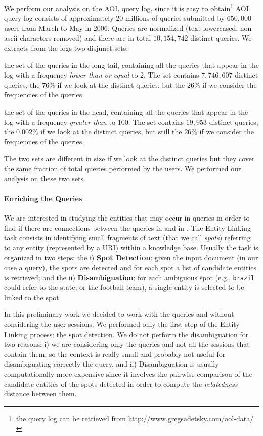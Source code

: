 We perform our analysis on the AOL query log, since it is easy to obtain\footnote{the query log can be retrieved from \url{http://www.gregsadetsky.com/aol-data/}}
AOL query log consists of approximately 20 millions of queries submitted by $650,000$ users from March to May in 2006. Queries are normalized (text lowercased, non ascii characters removed) and 
there are in total $10,154,742$ distinct queries. We extracts from the logs two disjunct sets: 
\begin{description}
	\item{\tail{}} the set of the queries in the long tail, containing all the queries that appear in the log with a frequency \emph{lower than or equal} to $2$. The set contains 
	$7,746,607$ distinct queries, the $76\%$ if we look at the distinct queries, but the $26\%$ if we consider the frequencies of the queries.
	\item{\head{}} the set of the queries in the head, containing all the queries that appear in the log with a frequency \emph{greater than} to $100$. The set contains 
	$19,953$ distinct queries, the $0.002\%$ if we look at the distinct queries, but still the $26\%$ if we consider the frequencies of the queries.
\end{description}
The two sets are different in size if we look at the distinct queries but they cover the same fraction of total queries performed by the users. We performed our 
analysis on these two sets.

\paragraph{Enriching the Queries}
We are interested in studying the entities that may occur in queries in order to find if there are connections between the queries in \head{} and in \tail{}.
The Entity Linking task consists in identifying  small fragments of text (that we call \emph{spots}) referring to any entity (represented by a URI) 
within a knowledge base. Usually the task is organized in two steps: the i) \textbf{Spot Detection}: given the input document (in our case a query), 
the spots are detected and for each spot a list of candidate entities is retrieved; and the ii) \textbf{Disambiguation}:
for each ambiguous spot (e.g., \texttt{brazil} could refer to the state, or the football team), a single  entity is 
selected  to be linked to the spot.

In this preliminary work we decided to work with the queries and without considering the user sessions. We performed only the first step of the Entity Linking 
process: the spot detection. We do not perform the disambiguation for two reasons: i) we are considering only the queries and not all the sessions that contain 
them, so the context is really small and probably not useful for disambiguating correctly the query, and ii) Disambiguation is usually computationally more expensive
since it involves the pairwise comparison of the candidate entities of the spots
detected in order to compute the \emph{relatedness}\cite{milne2008learning} distance between them.

